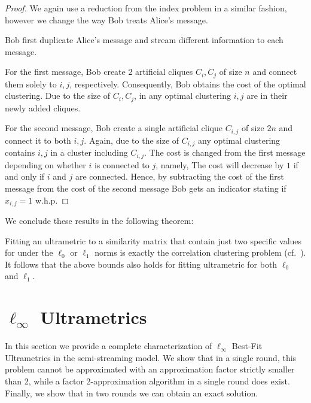 \documentclass{article}
\newcommand{\clique}[1]{C_{#1}}
\begin{document}
\begin{proof}
    We again use a reduction from the index problem in a similar fashion, however we change the way Bob treats Alice's message.

    Bob first duplicate Alice's message and stream different information to each message.

    For the first message, Bob create 2 artificial cliques $\clique{i}, \clique{j}$ of size $n$ and connect them solely to $i,j$, respectively. Consequently, Bob obtains the cost of the optimal clustering. Due to the size of $\clique{i}, \clique{j}$, in any optimal clustering $i,j$ are in their newly added cliques. 

    For the second message, Bob create a single artificial clique $\clique{i,j}$ of size $2n$ and connect it to both $i,j$. Again, due to the size of $\clique{i,j}$ any optimal clustering contains $i,j$ in a cluster including $\clique{i,j}$.
    The cost is changed from the first message depending on whether $i$ is connected to $j$, namely,
    The cost will decrease by $1$ if and only if $i$ and $j$ are connected.     
    Hence, by subtracting the cost of the first message from the cost of the second message Bob gets an indicator stating if $x_{i,j}=1$ w.h.p.
    \end{proof}

We conclude these results in the following theorem:

\lbzeroclusteringorscore*

Fitting an ultrametric to a similarity matrix that contain just two specific values for under the $\ell_0$ or $\ell_1$ norms is exactly the correlation clustering problem (cf.~\cite{charikar}). It follows that the above bounds also holds for fitting ultrametric for both $\ell_0$ and $\ell_1$.

\lbzeroultrametric*


\section{\texorpdfstring{$\ell_\infty$ Ultrametrics}{l-inf Ultrametrics}} \label{section:linf}

In this section we provide a complete characterization of $\ell_\infty$ Best-Fit Ultrametrics in the semi-streaming model.
We show that in a single round, this problem cannot be approximated with an approximation factor strictly smaller than 2, while a factor 2-approximation algorithm in a single round does exist. Finally, we show that in two rounds we can obtain an exact solution. 
\end{document}
